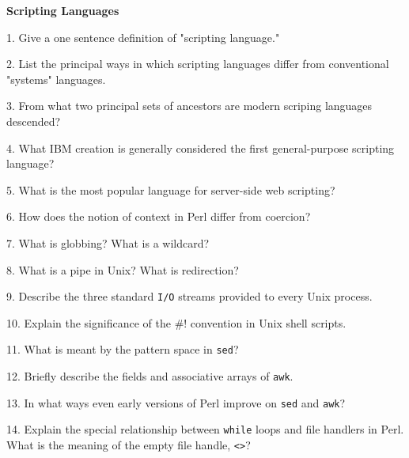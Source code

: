 \centerline{\bf Scripting Languages}

\vskip 1cm

1. Give a one sentence definition of "scripting language."

\filbreak
\vskip 1cm

2. List the principal ways in which scripting languages differ from conventional "systems" languages.

\filbreak
\vskip 1cm

3. From what two principal sets of ancestors are modern scriping languages descended?

\filbreak
\vskip 1cm

4. What IBM creation is generally considered the first general-purpose scripting language?

\filbreak
\vskip 1cm

5. What is the most popular language for server-side web scripting?

\filbreak
\vskip 1cm

6. How does the notion of context in Perl differ from coercion?

\filbreak
\vskip 1cm

7. What is globbing? What is a wildcard?

\filbreak
\vskip 1cm

8. What is a pipe in Unix? What is redirection?

\filbreak
\vskip 1cm

9. Describe the three standard {\tt I/O} streams provided to every Unix process.

\filbreak
\vskip 1cm

10. Explain the significance of the $\# !$ convention in Unix shell scripts.

\filbreak
\vskip 1cm

11. What is meant by the pattern space in {\tt sed}?

\filbreak
\vskip 1cm

12. Briefly describe the fields and associative arrays of {\tt awk}.

\filbreak
\vskip 1cm

13. In what ways even early versions of Perl improve on {\tt sed} and {\tt awk}?

\filbreak
\vskip 1cm

14. Explain the special relationship between {\tt while} loops and file handlers in Perl. What is the meaning of the empty file handle, {\tt <>}?

\filbreak
\vskip 1cm

